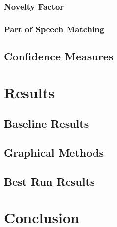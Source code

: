 \documentclass{article}
\begin{document}
\subsubsection{Novelty Factor}

\subsubsection{Part of Speech Matching}

\subsection{Confidence Measures}

\section{Results}


\subsection{Baseline Results}

\subsection{Graphical Methods}

\subsection{Best Run Results}

\section{Conclusion}
\end{document}
